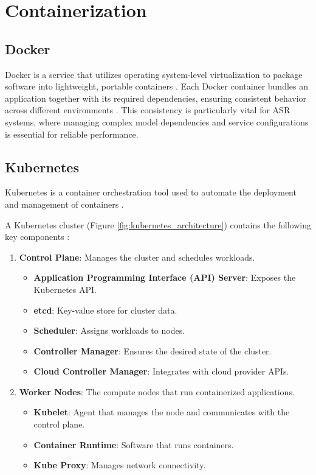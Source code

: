 \section{Containerization}
\subsection{Docker}
Docker is a service that utilizes operating system-level virtualization to package software into lightweight, portable containers \cite{docker_definition}. Each Docker container bundles an application together with its required dependencies, ensuring consistent behavior across different environments \cite{container_definition}. This consistency is particularly vital for ASR systems, where managing complex model dependencies and service configurations is essential for reliable performance.
\subsection{Kubernetes}
Kubernetes is a container orchestration tool used to automate the deployment and management of containers \cite{k8s_definition}. 

A Kubernetes cluster (Figure \ref{fig:kubernetes_architecture}) contains the following key components \cite{k8s_cluster}:
\begin{enumerate}
    \item \textbf{Control Plane}: Manages the cluster and schedules workloads.
    \begin{itemize}
        \item \textbf{Application Programming Interface (API) Server}: Exposes the Kubernetes API.
        \item \textbf{etcd}: Key-value store for cluster data.
        \item \textbf{Scheduler}: Assigns workloads to nodes.
        \item \textbf{Controller Manager}: Ensures the desired state of the cluster.
        \item \textbf{Cloud Controller Manager}: Integrates with cloud provider APIs.
    \end{itemize}
    \item \textbf{Worker Nodes}: The compute nodes that run containerized applications.
    \begin{itemize}
        \item \textbf{Kubelet}: Agent that manages the node and communicates with the control plane.
        \item \textbf{Container Runtime}: Software that runs containers.
        \item \textbf{Kube Proxy}: Manages network connectivity.
    \end{itemize}
\end{enumerate}

